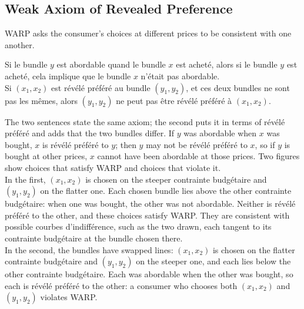 \subsection{Weak Axiom of Revealed Preference}

WARP asks the consumer's choices at different prices to be consistent with one
another.

\begin{definition}
  Si le bundle $y$ est abordable quand le bundle $x$ est acheté, alors si le
  bundle $y$ est acheté, cela implique que le bundle $x$ n'était pas abordable.\\
  Si $(x_1, x_2)$ est révélé préféré au bundle $(y_1, y_2)$, et ces deux bundles
  ne sont pas les mêmes, alors $(y_1, y_2)$ ne peut pas être révélé préféré à
  $(x_1, x_2)$.
\end{definition}

The two sentences state the same axiom; the second puts it in terms of révélé
préféré and adds that the two bundles differ. If $y$ was abordable when $x$ was
bought, $x$ is révélé préféré to $y$; then $y$ may not be révélé préféré to $x$, so
if $y$ is bought at other prices, $x$ cannot have been abordable at those prices.
Two figures show choices that satisfy WARP and choices that violate it.\\

In the first, $(x_1, x_2)$ is chosen on the steeper contrainte budgétaire and
$(y_1, y_2)$ on the flatter one. Each chosen bundle lies above the other
contrainte budgétaire: when one was bought, the other was not abordable. Neither
is révélé préféré to the other, and these choices satisfy WARP. They are
consistent with possible courbes d'indifférence, such as the two drawn, each
tangent to its contrainte budgétaire at the bundle chosen there.\\

In the second, the bundles have swapped lines: $(x_1, x_2)$ is chosen on the
flatter contrainte budgétaire and $(y_1, y_2)$ on the steeper one, and each lies
below the other contrainte budgétaire. Each was abordable when the other was
bought, so each is révélé préféré to the other: a consumer who chooses both
$(x_1, x_2)$ and $(y_1, y_2)$ violates WARP.

